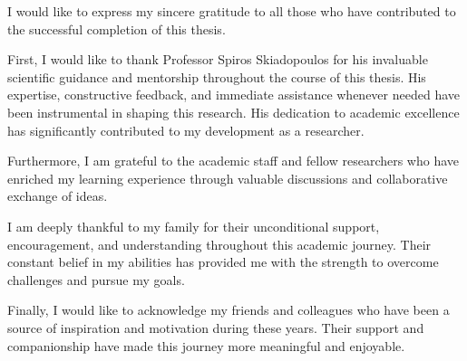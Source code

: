 I would like to express my sincere gratitude to all those who have contributed to the successful completion of this thesis.

First, I would like to thank Professor Spiros Skiadopoulos for his invaluable scientific guidance and mentorship throughout the course of this thesis. His expertise, constructive feedback, and immediate assistance whenever needed have been instrumental in shaping this research. His dedication to academic excellence has significantly contributed to my development as a researcher.

Furthermore, I am grateful to the academic staff and fellow researchers who have enriched my learning experience through valuable discussions and collaborative exchange of ideas.

I am deeply thankful to my family for their unconditional support, encouragement, and understanding throughout this academic journey. Their constant belief in my abilities has provided me with the strength to overcome challenges and pursue my goals.

Finally, I would like to acknowledge my friends and colleagues who have been a source of inspiration and motivation during these years. Their support and companionship have made this journey more meaningful and enjoyable. 